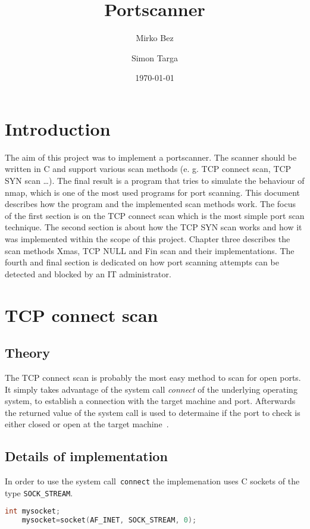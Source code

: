 \documentclass[a4paper]{scrartcl}
\begin{document}
	\title{Portscanner} \author{Mirko Bez \and  Simon Targa} \date{\today} \maketitle
	\tableofcontents
	\newpage

	\section*{Introduction}
	The aim of this project was to implement a portscanner. The scanner should be written in C and support various scan methods (e. g. TCP connect scan, TCP SYN scan \dots).
	The final result is a program that tries to simulate the behaviour of nmap, which is one of the most used programs for port scanning. This document
	describes how the program and the implemented scan methods work. The focus of the first section is on the TCP connect scan which is the most simple port scan technique. The second
	section is about how the TCP SYN scan works and how it was implemented within the scope of this project. Chapter three describes the scan methods Xmas, TCP NULL and Fin scan and their
	implementations. The fourth and final section is dedicated on how port scanning attempts can be detected and blocked by an IT administrator.
	
	
	\section{TCP connect scan}
	\subsection{Theory}
	The TCP connect scan is probably the most easy method to scan for open ports. It simply takes advantage of the system call
	\textit{connect} of the underlying operating system, to establish a connection with the target machine and port. Afterwards the
	returned value of the system call is used to determaine if the port to check is either closed or open at the target machine~\cite{nmap2009}. 
	
	
	\subsection{Details of implementation}
	In order to use the system call~\lstinline{connect} the implemenation uses C sockets of the type \lstinline|SOCK_STREAM|. 
	\begin{lstlisting}[frame= single, language=C, caption=Code to create C socket of type \lstinline|SOCK_STREAM|]
	int mysocket;
	mysocket=socket(AF_INET, SOCK_STREAM, 0);
	\end{lstlisting}
	
\end{document}
